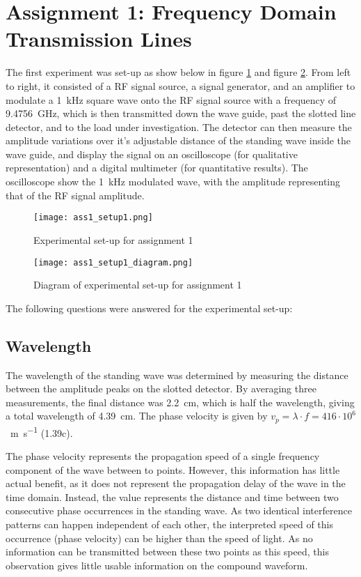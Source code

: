 \section*{Assignment 1: Frequency Domain Transmission Lines}

The first experiment was set-up as show below in figure \ref{fig:setup_1} and figure \ref{fig:setup_1_diagram}. From left to right, it consisted of a RF signal source, a signal generator, and an amplifier to modulate a \SI{1}{\kilo\hertz} square wave onto the RF signal source with a frequency of \SI{9.4756}{\giga\hertz}, which is then transmitted down the wave guide, past the slotted line detector, and to the load under investigation. The detector can then measure the amplitude variations over it's adjustable distance of the standing wave inside the wave guide, and display the signal on an oscilloscope (for qualitative representation) and a digital multimeter (for quantitative results). The oscilloscope show the \SI{1}{\kilo\hertz} modulated wave, with the amplitude representing that of the RF signal amplitude.

\begin{figure}[H]
	\centering
	\texttt{[image: ass1\_setup1.png]}
	\caption{Experimental set-up for assignment 1 \cite[p.3]{lab_manual}}
	\label{fig:setup_1}
\end{figure}

\begin{figure}[H]
	\centering
	\texttt{[image: ass1\_setup1\_diagram.png]}
	\caption{Diagram of experimental set-up for assignment 1}
	\label{fig:setup_1_diagram}
\end{figure}

The following questions were answered for the experimental set-up:

\subsection*{Wavelength}
The wavelength of the standing wave was determined by measuring the distance between the amplitude peaks on the slotted detector. By averaging three measurements, the final distance was \SI{2.2}{\centi\meter}, which is half the wavelength, giving a total wavelength of \SI{4.39}{\centi\meter}. The phase velocity is given by $v_{p} = \lambda \cdot f = 416 \cdot 10^6$ \SI {}{\meter\per\second} (1.39c).

The phase velocity represents the propagation speed of a single frequency component of the wave between to points. However, this information has little actual benefit, as it does not represent the propagation delay of the wave in the time domain. Instead, the value represents the distance and time between two consecutive phase occurrences in the standing wave. As two identical interference patterns can happen independent of each other, the interpreted speed of this occurrence (phase velocity) can be higher than the speed of light. As no information can be transmitted between these two points as this speed, this observation gives little usable information on the compound waveform.


